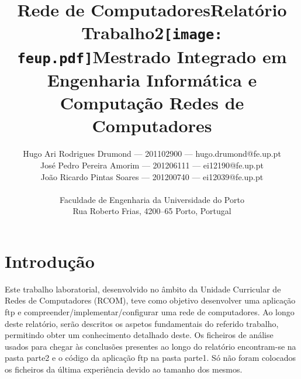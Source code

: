 \documentclass[a4paper]{article}
\begin{document}
\setlength{\textwidth}{16cm} \setlength{\textheight}{22cm}

\title{\Huge\textbf{Rede de Computadores}\linebreak\linebreak\linebreak\linebreak \Large\textbf{Relatório \\
    Trabalho2}\linebreak\linebreak\linebreak\texttt{[image: feup.pdf]}\linebreak \linebreak \Large{Mestrado Integrado em
    Engenharia Informática e Computação} \linebreak \linebreak \Large\textbf{Redes de
Computadores}\linebreak}

\author{Hugo Ari Rodrigues Drumond --- 201102900 --- hugo.drumond@fe.up.pt \\
    José Pedro Pereira Amorim --- 201206111 --- ei12190@fe.up.pt \\ João
    Ricardo Pintas Soares --- 201200740 ---
    ei12039@fe.up.pt\linebreak\linebreak\linebreak \\ \\ Faculdade de
    Engenharia da Universidade do Porto \\ Rua Roberto Frias, 4200--65 Porto,
    Portugal \linebreak\linebreak\linebreak \linebreak\linebreak\vspace{1cm}}
    \maketitle \thispagestyle{empty}

\newpage

\section{Introdução}
Este trabalho laboratorial, desenvolvido no âmbito da Unidade Curricular de
Redes de Computadores (RCOM), teve como objetivo desenvolver uma aplicação ftp
e compreender/implementar/configurar uma rede de computadores. Ao longo deste
relatório, serão descritos os aspetos fundamentais do referido trabalho,
permitindo obter um conhecimento detalhado deste. Os ficheiros de análise
usados para chegar às conclusões presentes ao longo do relatório encontram-se
na pasta parte2 e o código da aplicação ftp na pasta parte1. Só não foram colocados os ficheiros da última experiência devido ao tamanho dos mesmos.
\end{document}
